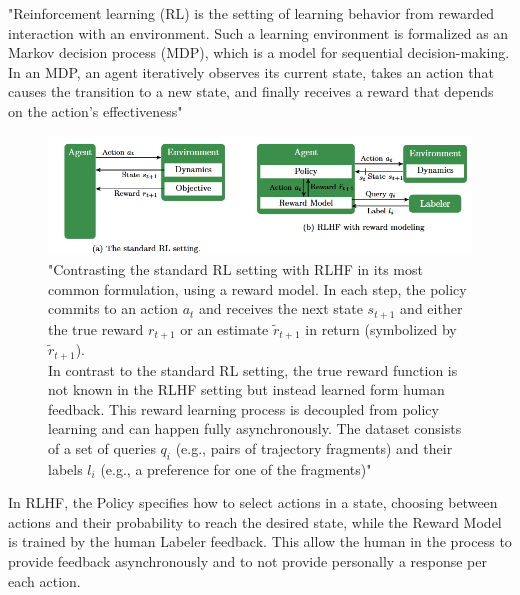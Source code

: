 \documentclass[12pt]{article}
\begin{document}
"Reinforcement learning (RL)\cite{ReinforcementLearningAnIntroduction} is the setting of learning behavior from rewarded interaction with an environment. Such a learning environment is formalized as an Markov decision process (MDP), which is a model for sequential decision-making. In an MDP, an agent iteratively observes its current state, takes an action that causes the transition to a new state, and finally receives a reward that depends on the action’s effectiveness"\cite{kaufmann2024surveyreinforcementlearninghuman}
    \begin{figure}[H]
    \centering
            \includegraphics[width=1\textwidth]{RL_and_RLHF.png}
    \caption[reward models in RL and RLHF]{"Contrasting the standard RL setting with RLHF in its most common formulation, using a reward model. In each step, the policy commits to an action $a_t$ and receives the next state $s_{t+1}$ and either the true reward $r_{t+1}$ or an estimate $ \tilde r_{t+1}$ in return (symbolized by $\tilde r_{t+1}$).\\ In contrast to the standard RL setting, the true reward function is not known in the RLHF setting but instead learned form human feedback. This reward learning process is decoupled from policy learning and can happen fully asynchronously. The dataset consists of a set of queries $q_i$ (e.g., pairs of trajectory fragments) and their labels $l_i$ (e.g., a preference for one of the fragments)"\cite{kaufmann2024surveyreinforcementlearninghuman}}
    \end{figure}
\noindent In RLHF, the Policy specifies how to select actions in a state, choosing between actions and their probability to reach the desired state, while the Reward Model is trained by the human Labeler feedback. This allow the human in the process to provide feedback asynchronously and to not provide personally a response per each action.\cite{kaufmann2024surveyreinforcementlearninghuman}\\

    
\end{document}
